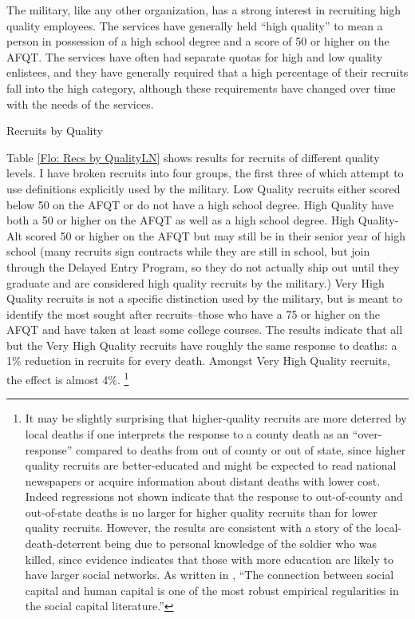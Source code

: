 \documentclass[12pt] {article}
\begin{document}
The military, like any other organization, has a strong interest in
recruiting high quality employees. The services have generally held {}``high
quality'' to mean a person in possession of a high school degree
and a score of 50 or higher on the AFQT. The services have often had
separate quotas for high and low quality enlistees, and they have
generally required that a high percentage of their recruits fall into
the high category, although these requirements have changed over time
with the needs of the services. 

\begin{table}
\caption{Recruits by Quality}
\label{Flo: Recs by QualityLN}
\scalebox{0.7}{%
}%
\end{table}

Table \ref{Flo: Recs by QualityLN} shows results for recruits
of different quality levels. I have broken recruits into four groups, the first three of which attempt to use definitions explicitly used by the military.
Low Quality recruits either scored below 50 on the AFQT or do not
have a high school degree. High Quality have both a 50 or higher on
the AFQT as well as a high school degree. High Quality-Alt scored
50 or higher on the AFQT but may still be in their senior year of
high school (many recruits sign contracts while they are still in
school, but join through the Delayed Entry Program, so they do not
actually ship out until they graduate and are considered high quality
recruits by the military.) Very High Quality recruits is not a specific
distinction used by the military, but is meant to identify the most
sought after recruits--those who have a 75 or higher on the AFQT and
have taken at least some college courses. %
The results indicate that all but the Very High Quality recruits have roughly the same response to deaths: a 1\% reduction in recruits for every
death. Amongst Very High Quality recruits, the effect is almost 4\%.%
\footnote{It may be slightly surprising that higher-quality recruits are more
deterred by local deaths if one interprets the response to a county
death as an {}``over-response'' compared to deaths from out of county
or out of state, since higher quality recruits are better-educated
and might be expected to read national newspapers or acquire information
about distant deaths with lower cost. Indeed regressions not shown
indicate that the response to out-of-county and out-of-state deaths
is no larger for higher quality recruits than for lower quality recruits.
However, the results are consistent with a story of the local-death-deterrent
being due to personal knowledge of the soldier who was killed, since
evidence indicates that those with more education are likely to have
larger social networks. As written in \cite{GlaeserSocialNetworks},
{}``The connection between social capital and human capital is one
of the most robust empirical regularities in the social capital literature.''} 
\end{document}
